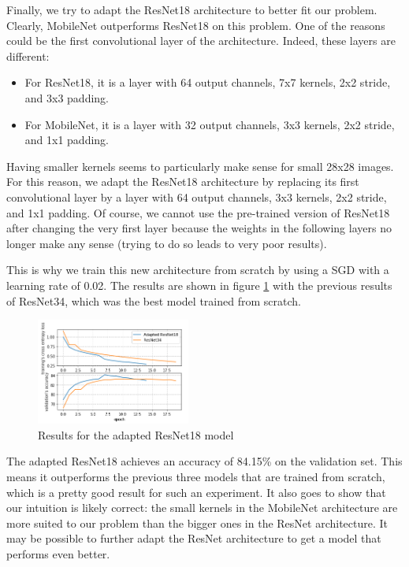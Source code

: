 \documentclass[10pt,twocolumn,letterpaper]{article}
\begin{document}
Finally, we try to adapt the ResNet18 architecture to better fit our problem. Clearly, MobileNet outperforms ResNet18 on this problem. One of the reasons could be the first convolutional layer of the architecture. Indeed, these layers are different:

\begin{itemize}
    \item For ResNet18, it is a layer with 64 output channels, 7x7 kernels, 2x2 stride, and 3x3 padding.
    \item For MobileNet, it is a layer with 32 output channels, 3x3 kernels, 2x2 stride, and 1x1 padding.
\end{itemize}

Having smaller kernels seems to particularly make sense for small 28x28 images. For this reason, we adapt the ResNet18 architecture by replacing its first convolutional layer by a layer with 64 output channels, 3x3 kernels, 2x2 stride, and 1x1 padding. Of course, we cannot use the pre-trained version of ResNet18 after changing the very first layer because the weights in the following layers no longer make any sense (trying to do so leads to very poor results).

This is why we train this new architecture from scratch by using a SGD with a learning rate of 0.02. The results are shown in figure \ref{fig:cnn_adapted} with the previous results of ResNet34, which was the best model trained from scratch.

\begin{figure}[h] 
\centering
\includegraphics[width=0.45\textwidth]{images/cnn_adapted_results.png}
\caption{Results for the adapted ResNet18 model}
\label{fig:cnn_adapted}
\end{figure}

The adapted ResNet18 achieves an accuracy of 84.15\% on the validation set. This means it outperforms the previous three models that are trained from scratch, which is a pretty good result for such an experiment. It also goes to show that our intuition is likely correct: the small kernels in the MobileNet architecture are more suited to our problem than the bigger ones in the ResNet architecture. It may be possible to further adapt the ResNet architecture to get a model that performs even better.
\end{document}
